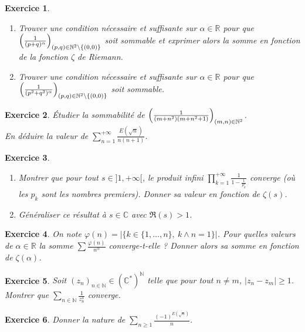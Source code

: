 \documentclass[12pt]{article}
\newtheorem{exercise}{Exercice}[section]
\theoremstyle{remark}
\theoremstyle{remark}
\newcommand{\R}{\mathbb{R}}
\newcommand{\C}{\mathbb{C}}
\newcommand{\N}{\mathbb{N}}
\begin{document}
\begin{exercise}
	\phantom{}
	\begin{enumerate}
		\item Trouver une condition nécessaire et suffisante sur $\alpha\in\R$
		pour que
		$\Bigl(\frac{1}{(p+q)^{\alpha}}\Bigr)_{(p,q)\in\N^{2}\setminus\{(0,0)\}}$
		soit sommable et exprimer alors la somme en fonction de la fonction
		$\zeta$ de Riemann.
		\item Trouver une condition nécessaire et suffisante sur $\alpha\in\R$
		pour que
		$\Bigl(\frac{1}{(p^{2}+q^{2})^{\alpha}}\Bigr)_{(p,q)\in\N^{2}\setminus\{(0,0)\}}$
		soit sommable.
	\end{enumerate}
\end{exercise}

\begin{exercise}
	Étudier la sommabilité de
	$\Bigl(\frac{1}{(m+n^{2})(m+n^{2}+1)}\Bigr)_{(m,n)\in\N^{2}}$.\\
	En déduire la
	valeur de $\sum_{n=1}^{+\infty}\frac{E(\sqrt{n})}{n(n+1)}$.
\end{exercise}

\begin{exercise}
	\phantom{}
	\begin{enumerate}
		\item Montrer que pour tout $s\in]1,+\infty[$, le produit infini
		$\prod_{k=1}^{+\infty}\frac{1}{1-\frac{1}{p_{k}^{s}}}$ converge (où les
		$p_{k}$ sont les nombres premiers). Donner sa valeur en fonction de
		$\zeta(s)$.
		\item Généraliser ce résultat à $s\in\C$ avec $\Re(s)>1$.
	\end{enumerate}
\end{exercise}

\begin{exercise}
	On note $\varphi(n)=\vert\{k\in\{1,\dots,n\},~k\wedge n=1\}\vert$. Pour quelles
	valeurs de $\alpha\in\R$ la somme $\sum \frac{\varphi(n)}{n^{\alpha}}$
	converge-t-elle ? Donner alors sa somme en fonction de $\zeta(\alpha)$.
\end{exercise}

\begin{exercise}
	Soit $(z_{n})_{n\in\N}\in(\C^{*})^{\N}$ telle que pour tout $n\neq m$,
	$\vert z_{n}-z_{m}\vert\geqslant1$. Montrer que
	$\sum_{n\in\N}\frac{1}{z_{n}^{3}}$ converge.
\end{exercise}

\begin{exercise}
	Donner la nature de $\sum_{n\geqslant1}\frac{(-1)^{E(\sqrt{n})}}{n}$.
\end{exercise}
\end{document}
